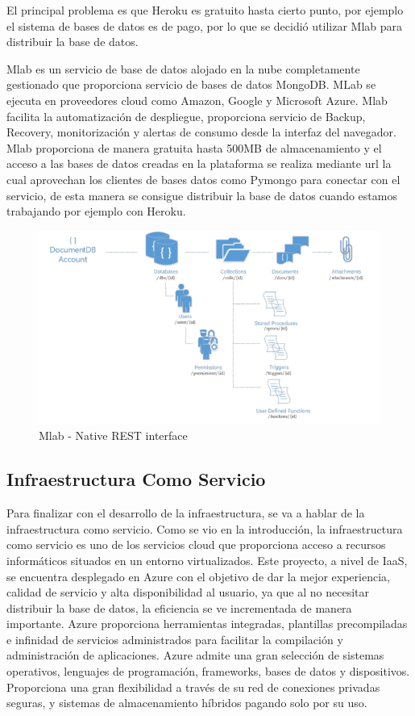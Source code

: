 \documentclass[a4paper,11pt]{book}
\begin{document}
El principal problema es que Heroku es gratuito hasta cierto punto, por ejemplo el sistema de bases de datos es de pago, por lo que se decidió utilizar Mlab para distribuir la base de datos.

Mlab\cite{mlab} es un servicio de base de datos alojado en la nube completamente gestionado que proporciona servicio de bases de datos MongoDB. MLab se ejecuta en proveedores cloud como Amazon, Google y Microsoft Azure. Mlab facilita la automatización de despliegue, proporciona servicio de Backup, Recovery, monitorización y alertas de consumo desde la interfaz del navegador. Mlab proporciona de manera gratuita hasta 500MB de almacenamiento y el acceso a las bases de datos creadas en la plataforma se realiza mediante url la cual aprovechan los clientes de bases datos como Pymongo para conectar con el servicio, de esta manera se consigue distribuir la base de datos cuando estamos trabajando por ejemplo con Heroku. 

\begin{figure}[H] 
\centering 
\includegraphics[scale=0.95]{imagenes/desarrollo_herramienta/mlab.png}
\caption{ Mlab - Native REST interface\cite{mlabL}  }  
\end{figure} 
  

\subsection{Infraestructura Como Servicio}
Para finalizar con el desarrollo de la infraestructura, se va a hablar de la infraestructura como servicio. Como se vio en la introducción, la infraestructura como servicio es uno de los servicios cloud que proporciona acceso a recursos informáticos situados en un entorno virtualizados. Este proyecto, a nivel de IaaS, se encuentra desplegado en Azure\cite{azure} con el objetivo de  dar la mejor experiencia, calidad de servicio y alta disponibilidad al usuario, ya que al no necesitar distribuir la base de datos, la eficiencia se ve incrementada de manera importante.
Azure proporciona herramientas integradas, plantillas precompiladas e infinidad de servicios administrados para facilitar la compilación y administración de aplicaciones. Azure admite una gran selección de sistemas operativos, lenguajes de programación, frameworks, bases de datos y dispositivos. Proporciona una gran flexibilidad a través de su red de conexiones privadas seguras, y sistemas de almacenamiento híbridos pagando solo por su uso. 
\end{document}
